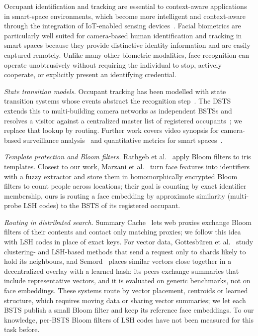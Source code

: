 \documentclass[pdflatex,sn-mathphys-num]{sn-jnl}%
\theoremstyle{thmstyleone}%
\theoremstyle{thmstyletwo}%
\theoremstyle{thmstylethree}%
\begin{document}
Occupant identification and tracking are essential to context-aware applications in smart-space environments, which become more intelligent and context-aware through the integration of IoT-enabled sensing devices~\cite{KZGS2024}. Facial biometrics are particularly well suited for camera-based human identification and tracking in smart spaces because they provide distinctive identity information and are easily captured remotely. Unlike many other biometric modalities, face recognition can operate unobtrusively without requiring the individual to stop, actively cooperate, or explicitly present an identifying credential.

\emph{State transition models.} Occupant tracking has been modelled with state transition systems whose events abstract the recognition step~\cite{MJG2011}. The DSTS extends this to multi-building camera networks as independent BSTSs and resolves a visitor against a centralized master list of registered occupants~\cite{mohan2020}; we replace that lookup by routing. Further work covers video synopsis for camera-based surveillance analysis~\cite{NGA2022} and quantitative metrics for smart spaces~\cite{MMJ2025}.

\emph{Template protection and Bloom filters.} Rathgeb et al.~\cite{rathgeb2014} apply Bloom filters to iris templates. Closest to our work, Marzani et al.~\cite{marzani2026} turn face features into identifiers with a fuzzy extractor and store them in homomorphically encrypted Bloom filters to count people across locations; their goal is counting by exact identifier membership, ours is routing a face embedding by approximate similarity (multi-probe LSH codes) to the BSTS of its registered occupant.

\emph{Routing in distributed search.} Summary Cache~\cite{fan2000} lets web proxies exchange Bloom filters of their contents and contact only matching proxies; we follow this idea with LSH codes in place of exact keys. For vector data, Gottesb{\"u}ren et al.~\cite{gottesbueren2024} study clustering- and LSH-based methods that send a request only to shards likely to hold its neighbours, and Semord~\cite{wang2026semord} places similar vectors close together in a decentralized overlay with a learned hash; its peers exchange summaries that include representative vectors, and it is evaluated on generic benchmarks, not on face embeddings. These systems route by vector placement, centroids or learned structure, which requires moving data or sharing vector summaries; we let each BSTS publish a small Bloom filter and keep its reference face embeddings. To our knowledge, per-BSTS Bloom filters of LSH codes have not been measured for this task before.
\end{document}
